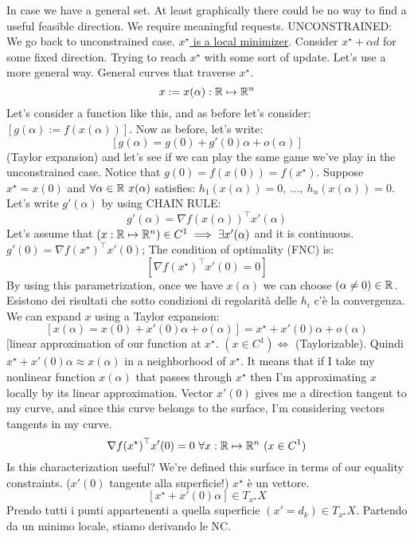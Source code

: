 In case we have a general set. At least graphically there could be no way to find a useful feasible direction. We require meaningful requests.
UNCONSTRAINED: We go back to unconstrained case. \underline{$x^\star$ is a local minimizer}. Consider $x^\star +\alpha d$ for some fixed direction. Trying to reach $x^\star$ with some sort of update. Let's use a more general way. General curves that traverse $x^\star$.
\[
	x := x(\alpha):\mathbb{R}\mapsto\mathbb{R}^n
\]
Let's consider a function like this, and as before let's consider: $[g(\alpha):=f(x(\alpha))]$. Now as before, let's write:
\[
	[g(\alpha) = g(0) + g'(0)\alpha + o(\alpha)]
\]
(Taylor expansion) and let's see if we can play the same game we've play in the unconstrained case. Notice that $g(0) = f(x(0)) = f(x^\star)$. Suppose $x^\star = x(0)$ and $\forall\alpha\in\mathbb{R}\ x(\alpha)$ satisfies:
$h_1(x(\alpha)) = 0,\ \dots,\ h_n(x(\alpha)) = 0$. Let's write $g'(\alpha)$ by using CHAIN RULE:
\[
	g'(\alpha) = \nabla{f(x(\alpha))}^\top x'(\alpha)
\]
Let's assume that $(x:\mathbb{R}\mapsto\mathbb{R}^n)\in C^1 \implies \exists x'(\alpha)$ and it is continuous. $g'(0) = \nabla{f(x^\star)}^\top x'(0)$; The condition of optimality (FNC) is:
\[
	[\nabla{f(x^\star)}^\top x'(0) = 0]
\]
By using this parametrization, once we have $x(\alpha)$ we can choose $(\alpha\neq 0)\in\mathbb{R}$. Esistono dei risultati che sotto condizioni di regolarità delle $h_i$ c'è la convergenza. We can expand $x$ using a Taylor expansion:
\[
	[x(\alpha) = x(0) + x'(0)\alpha + o(\alpha)] = x^\star + x'(0)\alpha + o(\alpha)
\]
[linear approximation of our function at $x^\star$. $(x\in C^1) \iff$ (Taylorizable). Quindi $x^\star + x'(0)\alpha \approx x(\alpha)$ in a neighborhood of $x^\star$. It means that if I take my nonlinear function $x(\alpha)$ that passes through $x^\star$ then I'm approximating $x$ locally by its linear approximation. Vector $x'(0)$ gives me a direction tangent to my curve, and since this curve belongs to the surface, I'm considering vectors tangents in my curve.
\[
	\nabla{f(x^\star)}^\top x'(0) = 0\ \forall x:\mathbb{R}\mapsto\mathbb{R}^n\ (x\in C^1)
\]
Is this characterization useful? We're defined this surface in terms of our equality constraints. ($x'(0)$ tangente alla superficie!) $x^\star$ è un vettore.
\[
	[x^\star + x'(0)\alpha] \in T_{x^\star}X
\]
Prendo tutti i punti appartenenti a quella superficie $(x'=d_k)\in T_{x^\star}X$. Partendo da un minimo locale, stiamo derivando le NC.

